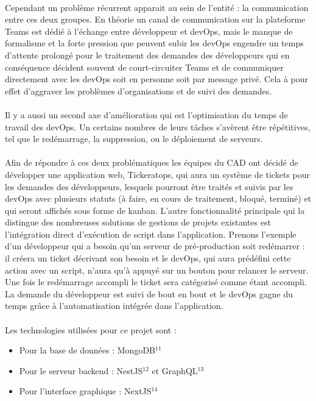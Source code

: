 \documentclass[12pt]{article}
\begin{document}
\begin {sloppypar}
\paragraph{}
Cependant un problème récurrent apparait au sein de l'entité : la communication entre ces deux 
groupes. En théorie un canal de communication sur la plateforme Teams est dédié à l'échange 
entre développeur et devOps, mais le manque de formalisme et la forte pression que peuvent 
subir les devOps engendre un temps d'attente prolongé pour le traitement des demandes des développeurs
qui en conséquence décident souvent de court-circuiter Teams et de communiquer directement
avec les devOps soit en personne soit par message privé. Cela à pour effet d'aggraver les problèmes
d'organisations et de suivi des demandes. 
\paragraph{}
Il y a aussi un second axe d'amélioration qui est l'optimisation du temps de travail des devOps. 
Un certains nombres de leurs tâches s'avèrent être répétitives, tel que le redémarrage, la suppression,
ou le déploiement de serveurs. 
\paragraph{}
Afin de répondre à ces deux problématiques les équipes du CAD ont décidé de développer une application web,
Tickeratops, qui aura un système de tickets pour les demandes des développeurs, lesquels pourront être
traités et suivis par les devOps avec plusieurs statuts (à faire, en cours de traitement, bloqué, terminé)
et qui seront affichés sous forme de kanban. L'autre fonctionnalité principale qui la distingue des 
nombreuses solutions de gestions de projets existantes est l'intégration direct d'exécution de script dans
l'application. Prenons l'exemple d'un développeur qui a besoin qu'un serveur de pré-production soit redémarrer : 
il créera un ticket décrivant son besoin et le devOps, qui aura prédéfini cette action avec un script, n'aura qu'à 
appuyé sur un bouton pour relancer le serveur. Une fois le redémarrage accompli le ticket sera catégorisé 
comme étant accompli. La demande du développeur est suivi de bout en bout et le devOps gagne du temps 
grâce à l'automatisation intégrée dans l'application.

\newpage
\paragraph{}
Les technologies utilisées pour ce projet sont : 
\begin{itemize}
  \item 
    Pour la base de données : MongoDB$^{11}$
  \item 
    Pour le serveur backend : NestJS$^{12}$ et GraphQL$^{13}$
  \item 
    Pour l'interface graphique : NextJS$^{14}$ 
\end{itemize}


\end{sloppypar}
\end{document}
